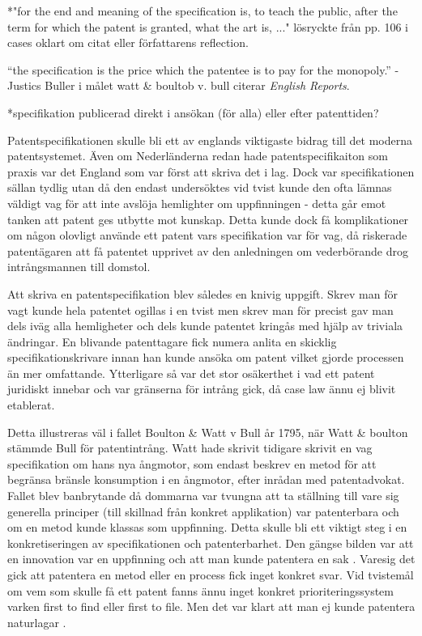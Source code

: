 *"for the end and meaning of the specification is, to teach the public, after the term for which the patent is granted, what the art is, ..." \cite{cases-davies} lösryckte från pp. 106 i cases oklart om citat eller författarens reflection.


“the specification is the price which 
the patentee is to pay for the monopoly.” -Justics Buller i målet watt \& boultob v. bull \cite{oked} citerar \emph{English Reports}.

*specifikation publicerad direkt i ansökan (för alla) eller efter patenttiden?

Patentspecifikationen skulle bli ett av englands viktigaste bidrag till det
moderna patentsystemet. Även om
Nederländerna redan hade patentspecifikaiton som praxis var det England som var först att skriva det i
lag. \cite{macleod} Dock var specifikationen sällan tydlig utan då den endast undersöktes vid tvist
kunde den ofta lämnas väldigt vag för att inte avslöja hemlighter om uppfinningen - detta går emot tanken
att patent ges utbytte mot kunskap. Detta kunde dock få komplikationer om någon olovligt använde ett
patent vars specifikation var för vag, då riskerade patentägaren att få patentet upprivet av den anledningen om vederbörande drog intrångsmannen till domstol.

Att skriva en patentspecifikation blev således en knivig uppgift. Skrev man för vagt kunde hela patentet
ogillas i en tvist men skrev man för precist gav man dels iväg alla hemligheter och dels kunde patentet
kringås med hjälp av triviala ändringar\cite{macleod}. En
blivande patenttagare fick numera anlita en skicklig specifikationskrivare innan han kunde ansöka om
patent vilket gjorde processen än mer omfattande\cite{macleod}. Ytterligare så var det stor osäkerthet i vad ett patent juridiskt innebar och var gränserna för intrång gick, då case law ännu ej blivit etablerat.

Detta illustreras väl i fallet Boulton \& Watt v Bull år 1795, när Watt \& boulton stämmde Bull för patentintrång. Watt hade skrivit tidigare skrivit en vag specifikation om hans nya ångmotor, som endast beskrev en metod för att begränsa bränsle konsumption i en ångmotor, efter inrådan med patentadvokat\cite{bracha}. Fallet blev banbrytande då dommarna var tvungna att ta ställning till vare sig generella principer (till skillnad från konkret applikation) var patenterbara och om en metod kunde klassas som uppfinning\cite{bracha}. Detta skulle bli ett viktigt steg i en konkretiseringen av specifikationen och patenterbarhet. Den gängse bilden var att en innovation var en uppfinning och att man kunde patentera en sak \cite{bracha}. Varesig det gick att patentera en metod eller en process fick inget konkret svar. Vid tvistemål om vem som skulle få ett patent fanns ännu inget konkret prioriteringssystem varken first to find eller first to file\cite{bracha}. Men det var klart att man ej kunde patentera naturlagar \cite{bracha}.


